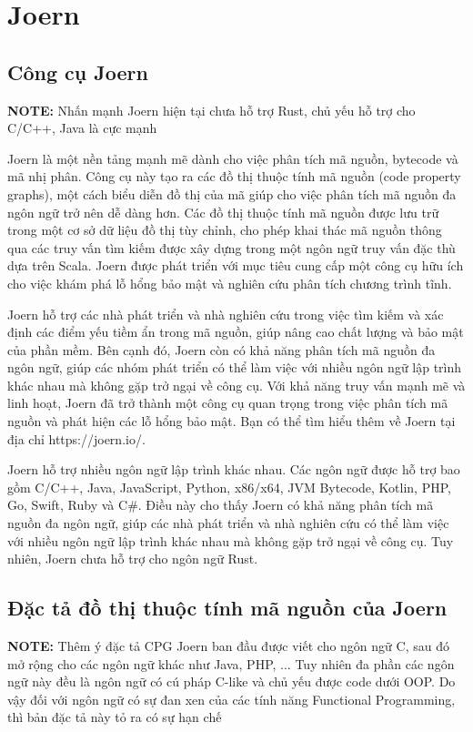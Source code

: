 \section{Joern}

\subsection{Công cụ Joern}

\textbf{NOTE:} Nhấn mạnh Joern hiện tại chưa hỗ trợ Rust, chủ yếu hỗ trợ cho C/C++, Java là cực mạnh

Joern là một nền tảng mạnh mẽ dành cho việc phân tích mã nguồn, bytecode và mã nhị phân. Công cụ này tạo ra các đồ thị thuộc tính mã nguồn (code property graphs), một cách biểu diễn đồ thị của mã giúp cho việc phân tích mã nguồn đa ngôn ngữ trở nên dễ dàng hơn. Các đồ thị thuộc tính mã nguồn được lưu trữ trong một cơ sở dữ liệu đồ thị tùy chỉnh, cho phép khai thác mã nguồn thông qua các truy vấn tìm kiếm được xây dựng trong một ngôn ngữ truy vấn đặc thù dựa trên Scala. Joern được phát triển với mục tiêu cung cấp một công cụ hữu ích cho việc khám phá lỗ hổng bảo mật và nghiên cứu phân tích chương trình tĩnh.

Joern hỗ trợ các nhà phát triển và nhà nghiên cứu trong việc tìm kiếm và xác định các điểm yếu tiềm ẩn trong mã nguồn, giúp nâng cao chất lượng và bảo mật của phần mềm. Bên cạnh đó, Joern còn có khả năng phân tích mã nguồn đa ngôn ngữ, giúp các nhóm phát triển có thể làm việc với nhiều ngôn ngữ lập trình khác nhau mà không gặp trở ngại về công cụ. Với khả năng truy vấn mạnh mẽ và linh hoạt, Joern đã trở thành một công cụ quan trọng trong việc phân tích mã nguồn và phát hiện các lỗ hổng bảo mật. Bạn có thể tìm hiểu thêm về Joern tại địa chỉ https://joern.io/.

Joern hỗ trợ nhiều ngôn ngữ lập trình khác nhau. Các ngôn ngữ được hỗ trợ bao gồm C/C++, Java, JavaScript, Python, x86/x64, JVM Bytecode, Kotlin, PHP, Go, Swift, Ruby và C\#. Điều này cho thấy Joern có khả năng phân tích mã nguồn đa ngôn ngữ, giúp các nhà phát triển và nhà nghiên cứu có thể làm việc với nhiều ngôn ngữ lập trình khác nhau mà không gặp trở ngại về công cụ.
Tuy nhiên, Joern chưa hỗ trợ cho ngôn ngữ Rust.

\subsection{Đặc tả đồ thị thuộc tính mã nguồn của Joern}

\textbf{NOTE:} Thêm ý đặc tả CPG Joern ban đầu được viết cho ngôn ngữ C, sau đó mở rộng cho các ngôn ngữ khác như Java, PHP, ... Tuy nhiên đa phần các ngôn ngữ này đều là ngôn ngữ có cú pháp C-like và chủ yếu được code dưới OOP. Do vậy đối với ngôn ngữ có sự đan xen của các tính năng Functional Programming, thì bản đặc tả này tỏ ra có sự hạn chế


